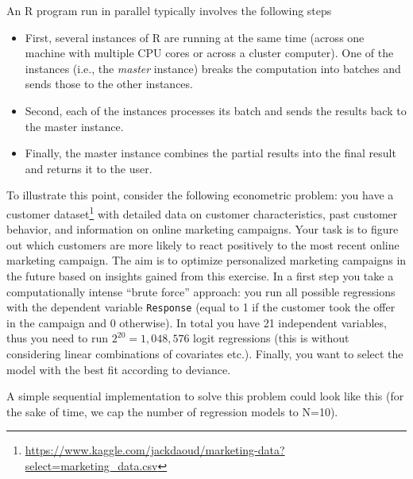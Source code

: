 \documentclass[
  12pt,
]{style/krantz}
\providecommand{\tightlist}{%
  \setlength{\itemsep}{0pt}\setlength{\parskip}{0pt}}
\renewcommand{\href}[2]{#2\footnote{\url{#1}}}
\begin{document}
An R program run in parallel typically involves the following steps

\begin{itemize}
\tightlist
\item
  First, several instances of R are running at the same time (across one machine with multiple CPU cores or across a cluster computer). One of the instances (i.e., the \emph{master} instance) breaks the computation into batches and sends those to the other instances.
\item
  Second, each of the instances processes its batch and sends the results back to the master instance.
\item
  Finally, the master instance combines the partial results into the final result and returns it to the user.
\end{itemize}

To illustrate this point, consider the following econometric problem: you have a customer \href{https://www.kaggle.com/jackdaoud/marketing-data?select=marketing_data.csv}{dataset} with detailed data on customer characteristics, past customer behavior, and information on online marketing campaigns. Your task is to figure out which customers are more likely to react positively to the most recent online marketing campaign. The aim is to optimize personalized marketing campaigns in the future based on insights gained from this exercise. In a first step you take a computationally intense ``brute force'' approach: you run all possible regressions with the dependent variable \texttt{Response} (equal to 1 if the customer took the offer in the campaign and 0 otherwise). In total you have 21 independent variables, thus you need to run \(2^20=1,048,576\) logit regressions (this is without considering linear combinations of covariates etc.). Finally, you want to select the model with the best fit according to deviance.

A simple sequential implementation to solve this problem could look like this (for the sake of time, we cap the number of regression models to N=10).
\end{document}
